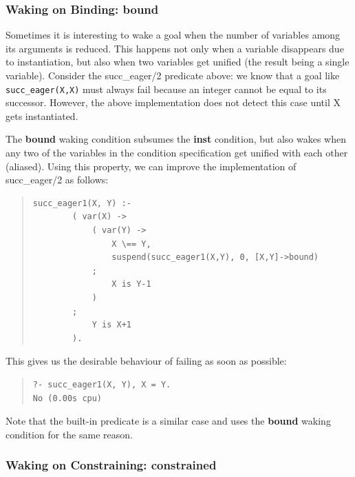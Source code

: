 \subsubsection{Waking on Binding: bound}

Sometimes it is interesting to wake a goal when the number of variables
among its arguments is reduced. This happens not only when a variable
disappears due to instantiation, but also when two variables get unified
(the result being a single variable). Consider the succ_eager/2 predicate
above: we know that a goal like \verb.succ_eager(X,X). must always fail
because an integer cannot be equal to its successor. However, the above
implementation does not detect this case until X gets instantiated.

The {\bf bound} waking condition subsumes the {\bf inst} condition, but
also wakes when any two of the variables in the condition specification get
unified with each other (aliased).
Using this property, we can improve the implementation of succ_eager/2
as follows:
\begin{quote}\begin{verbatim}
succ_eager1(X, Y) :-
        ( var(X) ->
            ( var(Y) ->
                X \== Y,
                suspend(succ_eager1(X,Y), 0, [X,Y]->bound)
            ;
                X is Y-1
            )
        ;
            Y is X+1
        ).
\end{verbatim}\end{quote}
This gives us the desirable behaviour of failing as soon as possible:
\begin{quote}\begin{verbatim}
?- succ_eager1(X, Y), X = Y.
No (0.00s cpu)
\end{verbatim}\end{quote}
Note that the built-in predicate
is a similar case and uses the {\bf bound} waking condition for the
same reason.



\subsubsection{Waking on Constraining: constrained}

